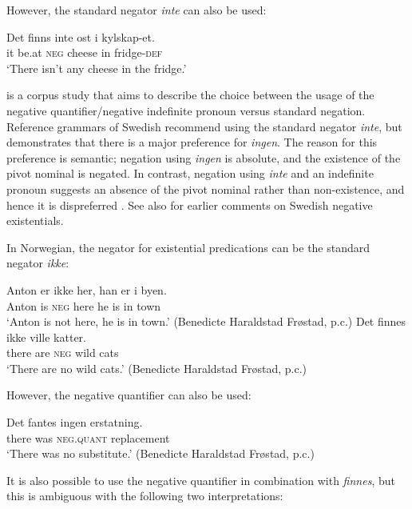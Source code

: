 \documentclass[output=paper,colorlinks,citecolor=brown]{langscibook}
\begin{document}
\begin{paperappendix}
\begin{unindented}
However, the standard negator \textit{inte} can also be used:
%
\begin{exe}\ex \gll Det finns inte ost i  kylskap-et. \\
it be.at \textsc{neg} cheese in fridge-\textsc{def} \\
\glt `There isn't any cheese in the fridge.' \citep[115]{Veselinova2013}
    \end{exe}

\citet{Bordal2017} is a corpus study that aims to describe the choice
between the usage of the negative quantifier\slash negative indefinite
pronoun versus standard negation. Reference grammars of Swedish recommend
using the standard negator \textit{inte}, but \textcite[15ff]{Bordal2017} demonstrates that there is a major preference for \textit{ingen}. The reason for this preference is semantic; negation using \textit{ingen} is absolute, and the existence of the pivot nominal is negated. In contrast, negation using \textit{inte} and an indefinite pronoun suggests an absence of the pivot nominal rather than non-existence, and hence it is dispreferred \citep[21--22]{Bordal2017}. See also \citet[114--115]{Veselinova2013} for earlier comments on Swedish negative existentials.


In Norwegian, the negator for existential predications can be the standard negator \textit{ikke}:
%
\begin{exe}\ex \gll Anton er ikke her, han er i byen.  \\
Anton is \textsc{neg} here he is in town \\
    \glt `Anton is not here, he is in town.' (Benedicte Haraldstad Frøstad, p.c.)
\ex \gll Det finnes ikke ville  katter. \\
there are \textsc{neg} wild cats \\
    \glt `There are no wild cats.' (Benedicte Haraldstad Frøstad, p.c.)
    \end{exe}

However, the negative quantifier can also be used:
%
\begin{exe}\ex \gll Det fantes ingen   erstatning. \\
there was    \textsc{neg.quant}  replacement \\
    \glt `There was no substitute.' (Benedicte Haraldstad Frøstad, p.c.)
    \end{exe}

It is also possible to use the negative quantifier in combination with \textit{finnes}, but this is ambiguous with the following two interpretations:


\end{unindented}
\end{paperappendix}
\end{document}
